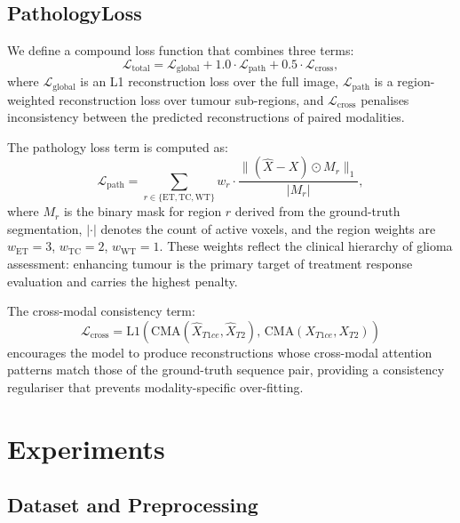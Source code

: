 \documentclass[conference]{IEEEtran}
\begin{document}
\subsection{PathologyLoss}

We define a compound loss function that combines three terms:
\begin{equation}
  \mathcal{L}_\mathrm{total} =
    \mathcal{L}_\mathrm{global} +
    1.0 \cdot \mathcal{L}_\mathrm{path} +
    0.5 \cdot \mathcal{L}_\mathrm{cross} ,
\end{equation}
where $\mathcal{L}_\mathrm{global}$ is an L1 reconstruction loss
over the full image, $\mathcal{L}_\mathrm{path}$ is a
region-weighted reconstruction loss over tumour sub-regions, and
$\mathcal{L}_\mathrm{cross}$ penalises inconsistency between the
predicted reconstructions of paired modalities.

The pathology loss term is computed as:
\begin{equation}
  \mathcal{L}_\mathrm{path} =
    \sum_{r \in \{\mathrm{ET, TC, WT}\}} w_r \cdot
    \frac{\| (\hat{X} - X) \odot M_r \|_1}{|M_r|} ,
\end{equation}
where $M_r$ is the binary mask for region $r$ derived from the
ground-truth segmentation, $|\cdot|$ denotes the count of active
voxels, and the region weights are $w_\mathrm{ET} = 3$,
$w_\mathrm{TC} = 2$, $w_\mathrm{WT} = 1$. These weights reflect
the clinical hierarchy of glioma assessment: enhancing tumour
is the primary target of treatment response evaluation and
carries the highest penalty.

The cross-modal consistency term:
\begin{equation}
  \mathcal{L}_\mathrm{cross} =
    \mathrm{L1}\!\left(
      \mathrm{CMA}(\hat{X}_{T1ce}, \hat{X}_{T2}),\,
      \mathrm{CMA}(X_{T1ce}, X_{T2})
    \right)
\end{equation}
encourages the model to produce reconstructions whose cross-modal
attention patterns match those of the ground-truth sequence pair,
providing a consistency regulariser that prevents modality-specific
over-fitting.

\section{Experiments}

\subsection{Dataset and Preprocessing}
\end{document}
